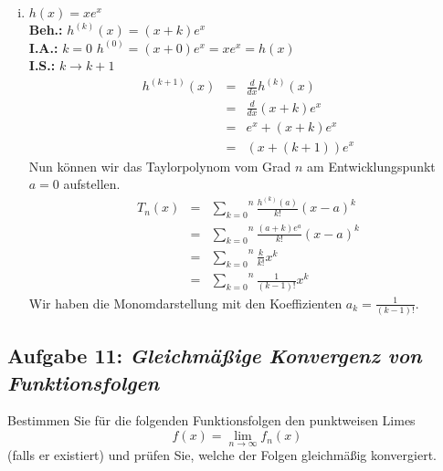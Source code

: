 \documentclass[11pt,a4paper,ngerman]{article}
\begin{document}
\begin{enumerate}[(i)]
    \item $h(x) = xe^x$\\
        \textbf{Beh.:} $h^{(k)}(x) = (x + k)e^x$\\
        \textbf{I.A.:} $k=0$ $h^{(0)} = (x + 0)e^x = xe^x = h(x)$\\
        \textbf{I.S.:} $k \rightarrow k+1$\\
            $$\begin{array}{rcl}
                h^{(k+1)}(x) &=& \frac{d}{dx} h^{(k)}(x)\\
                    &=& \frac{d}{dx} (x + k)e^x\\
                    &=& e^x + (x + k)e^x\\
                    &=& (x+(k+1))e^x
            \end{array}$$
        Nun können wir das Taylorpolynom vom Grad $n$ am Entwicklungspunkt $a=0$ aufstellen.
        $$\begin{array}{rcl}
            T_n(x) &=& \overset{n}{\underset{k=0}{\sum}}
               \frac{h^{(k)}(a)}{k!} (x-a)^k\\
                    &=& \overset{n}{\underset{k=0}{\sum}} \frac{(a+k)e^a}{k!} (x-a)^k\\
                    &=& \overset{n}{\underset{k=0}{\sum}} \frac{k}{k!} x^k\\
                    &=& \overset{n}{\underset{k=0}{\sum}} \frac{1}{(k-1)!} x^k
        \end{array}$$
        Wir haben die Monomdarstellung mit den Koeffizienten $a_k = \frac{1}{(k-1)!}$.

 
\end{enumerate}

\subsection*{Aufgabe 11: \mdseries\itshape Gleichmäßige Konvergenz von Funktionsfolgen}

Bestimmen Sie für die folgenden Funktionsfolgen den punktweisen Limes
$$
    f(x) = \lim_{n \rightarrow \infty} f_n(x)
$$
(falls er existiert) und prüfen Sie, welche der Folgen gleichmäßig konvergiert.
\end{document}
